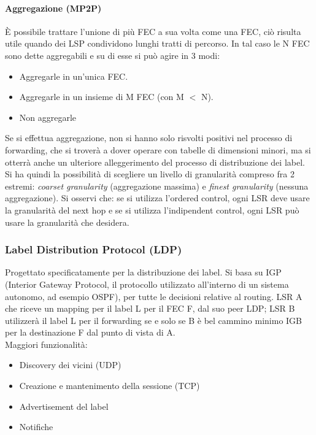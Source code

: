 \documentclass{article}
\begin{document}
\paragraph{Aggregazione (MP2P)} È possibile trattare l'unione di più FEC a sua volta come una FEC, ciò risulta utile quando dei LSP condividono lunghi tratti di percorso. In tal caso le N FEC sono dette aggregabili e su di esse si può agire in 3 modi:
\begin{itemize}
    \item Aggregarle in un'unica FEC.
    \item Aggregarle in un insieme di M FEC (con M $<$ N).
    \item Non aggregarle
\end{itemize}
Se si effettua aggregazione, non si hanno solo risvolti positivi nel processo di forwarding, che si troverà a dover operare con tabelle di dimensioni minori, ma si otterrà anche un ulteriore alleggerimento del processo di distribuzione dei label. Si ha quindi la possibilità di scegliere un livello di granularità compreso fra 2 estremi: \textit{coarset granularity} (aggregazione massima) e \textit{finest granularity} (nessuna aggregazione). Si osservi che: se si utilizza l'ordered control, ogni LSR deve usare la granularità del next hop e se si utilizza l'indipendent control, ogni LSR può usare la granularità che desidera.

\subsubsection{Label Distribution Protocol (LDP)} 
Progettato specificatamente per la distribuzione dei label. Si basa su IGP (Interior Gateway Protocol, il protocollo utilizzato all'interno di un sistema autonomo, ad esempio OSPF), per tutte le decisioni relative al routing. LSR A che riceve un mapping per il label L per il FEC F, dal suo peer LDP; LSR B utilizzerà il label L per il forwarding se e solo se B è bel cammino minimo IGB per la destinazione F dal punto di vista di A. \\ Maggiori funzionalità:
\begin{itemize}
    \item Discovery dei vicini (UDP)
    \item Creazione e mantenimento della sessione (TCP)
    \item Advertisement del label
    \item Notifiche
\end{itemize}
\end{document}
